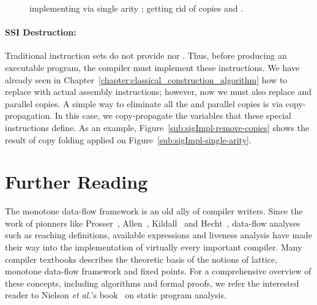 {\begin{figure}[t!]
\hspace{-1.2cm}
  \caption{\protect{} implementing \sigmafuns via single arity \phifuns; \protect{} getting rid of copies and \sigmafuns.}
\label{fig:sigImpl}
\end{figure}

\paragraph{SSI Destruction: }
Traditional instruction sets do not provide \phifuns nor \sigmafuns.
Thus, before producing an executable program, the compiler must implement these instructions.
We have already seen in Chapter~\ref{chapter:classical_construction_algorithm} how to replace \phifuns with actual assembly instructions; however, now we must also replace \sigmafuns and parallel copies.
A simple way to eliminate all the \sigmafuns and parallel copies is via copy-propagation.
In this case, we copy-propagate the variables that these special instructions define.
As an example, Figure~\ref{sub:sigImpl-remove-copies} shows the result of copy folding applied on Figure~\ref{sub:sigImpl-single-arity}.

\section{Further Reading}

The monotone data-flow framework is an old ally of compiler writers.
Since the work of pionners like Prosser~\cite{Prosser59}, Allen~\cite{Allen70,Allen76}, Kildall~\cite{Kildall77} and Hecht~\cite{Hecht77}, data-flow analyses such as reaching definitions, available expressions and liveness analysis have made their way into the implementation of virtually every important compiler.
Many compiler textbooks describes the theoretic basis of the notions of lattice, monotone data-flow framework and fixed points.
For a comprehensive overview of these concepts, including algorithms and formal proofs, we refer the interested reader to Nielson {\em et al.}'s book~\cite{Nielson05} on static program analysis.

}
